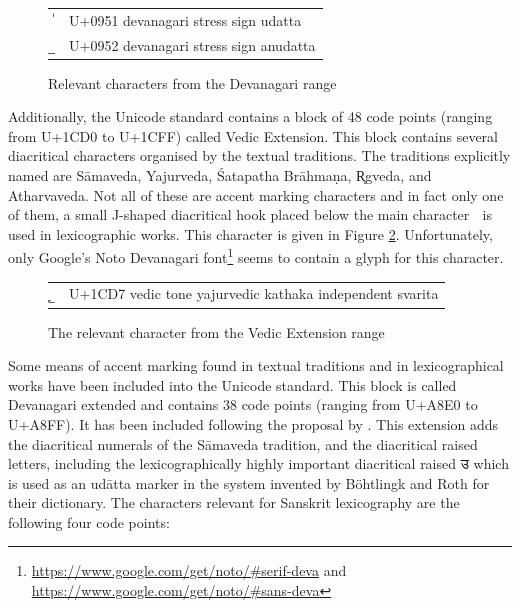 \begin{figure}[ht]
\begin{center}
\begin{tabular}{ll}
  {\devfont 	॑}& U+0951 {\sc devanagari stress sign udatta}\\
  {\devfont 	॒}& U+0952 {\sc devanagari stress sign anudatta}
\end{tabular}
\end{center}
\caption[Relevant characters from the Devanagari range]{\label{tab:unidev}Relevant characters from the Devanagari range}
\end{figure}

Additionally, the Unicode standard contains a block of 48 code points (ranging from U+1CD0 to U+1CFF) called Vedic Extension. This block contains several diacritical characters organised by the textual traditions. The traditions explicitly named are Sāmaveda, Yajurveda, Śatapatha Brāhmaṇa, R̥gveda, and Atharvaveda. Not all of these are accent marking characters and in fact only one of them, a small J-shaped diacritical hook placed below the main character {\devfont क᳗} is used in lexicographic works. This character is given in Figure \ref{fig:j-shape}. Unfortunately, only Google’s Noto Devanagari font\footnote{\url{https://www.google.com/get/noto/\#serif-deva} and \url{https://www.google.com/get/noto/\#sans-deva}} seems to contain a glyph for this character.

\begin{figure}[!ht]
\begin{center}
\begin{tabular}{ll}
  {\devfont ᳗ }& U+1CD7 {\sc vedic tone yajurvedic kathaka independent svarita}
\end{tabular}
\end{center}
\caption[The relevant character from the Vedic Extension range]{\label{fig:j-shape}The relevant character from the Vedic Extension range}
\end{figure}



Some means of accent marking found in textual traditions and in lexicographical works have been included into the Unicode standard. This block is called Devanagari extended and contains 38 code points (ranging from U+A8E0 to U+A8FF). It has been included following the proposal by \citet{EversonScharf2007}. This extension adds the diacritical numerals of the Sāmaveda tradition, and the diacritical raised letters, including the lexicographically highly important diacritical raised {\devfont उ} which is used as an udātta marker in the system invented by Böhtlingk and Roth for their dictionary. The characters relevant for Sanskrit lexicography are the following four code points:

